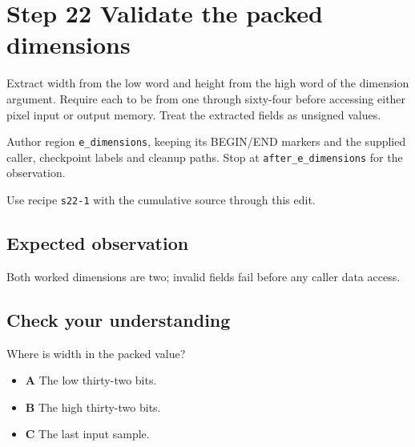 \section{Step 22 Validate the packed dimensions}\label{ppm-s22}

Extract width from the low word and height from the high word of the dimension argument. Require each to be from one through sixty-four before accessing either pixel input or output memory. Treat the extracted fields as unsigned values.

Author region \texttt{e\_dimensions}, keeping its BEGIN/END markers and the supplied caller, checkpoint labels and cleanup paths. Stop at \texttt{after\_e\_dimensions} for the observation.

Use recipe \texttt{s22-1} with the cumulative source through this edit.

\subsection{Expected observation}
Both worked dimensions are two; invalid fields fail before any caller data access.

\subsection{Check your understanding}
Where is width in the packed value?

\begin{itemize}
  \item \textbf{A} The low thirty-two bits.
  \item \textbf{B} The high thirty-two bits.
  \item \textbf{C} The last input sample.
\end{itemize}
